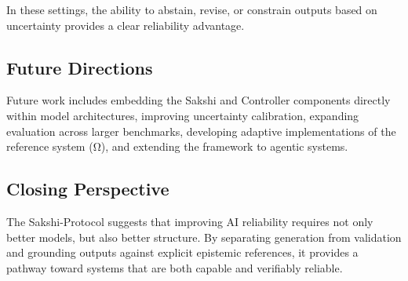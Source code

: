 \documentclass[12pt,a4paper]{article}
\begin{document}
In these settings, the ability to abstain, revise, or constrain outputs based on uncertainty provides a clear reliability advantage.

\subsection{Future Directions}

Future work includes embedding the Sakshi and Controller components directly within model architectures, improving uncertainty calibration, expanding evaluation across larger benchmarks, developing adaptive implementations of the reference system (Ω), and extending the framework to agentic systems.

\subsection{Closing Perspective}

The Sakshi-Protocol suggests that improving AI reliability requires not only better models, but also better structure. By separating generation from validation and grounding outputs against explicit epistemic references, it provides a pathway toward systems that are both capable and verifiably reliable.
\end{document}
